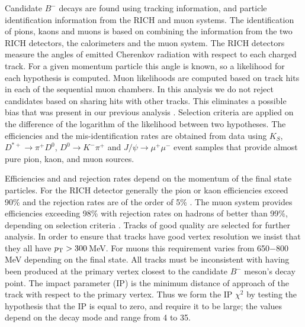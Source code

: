 \documentclass[12pt,a4paper]{article}
\def\to                 {\ensuremath{\rightarrow}\xspace}
\begin{document}
Candidate $B^-$ decays
are found using tracking information, and particle identification information from the RICH and muon systems. 
The identification of pions, kaons and muons is based on combining the information from the two RICH detectors, the calorimeters and the muon system. The RICH detectors measure the angles of emitted Cherenkov radiation with respect to each charged track. For a given momentum particle this angle is known, so a likelihood for each hypothesis is computed. Muon likelihoods are computed based on track hits in each of the sequential muon chambers. In this analysis we do not reject candidates based on sharing hits with other tracks. This eliminates a possible bias that was present in our previous analysis \cite{Aaij:2011ex}.
Selection criteria are applied on the difference of the logarithm of the likelihood between two hypotheses. The 
efficiencies and the mis-identification rates are obtained from data using $K_S$, $D^{*+}\to \pi^+ D^0$, $D^0\to K^-\pi^+$ and $J/\psi\to\mu^+\mu^-$ event samples that provide almost pure pion, kaon, and muon sources. 


Efficiencies and and rejection rates depend on the momentum of the final state particles. For the RICH detector generally the pion or kaon efficiencies exceed 90\% and the rejection rates are of the order of 5\% \cite{Powell:2011zz}. The muon system provides efficiencies exceeding 98\% with rejection rates on hadrons of better than 99\%, depending on selection criteria \cite{LHCb-PUB-2011-027}.
 Tracks of good quality are selected for further analysis. In order to ensure that tracks have good vertex resolution we insist that they all have $p_{\rm T}>300$\,MeV. For muons this requirement varies from 650$-$800\,MeV depending on the final state. All tracks must be inconsistent with having been 
produced at the primary vertex closest to the candidate $B^-$ meson's decay point. The impact parameter (IP) is the minimum distance of approach of the track with respect to the primary vertex. Thus we form the IP $\chi^2$  by testing the hypothesis that the IP is equal to zero, and require it to be large; the values depend on the decay mode and range from 4 to 35.
\end{document}
